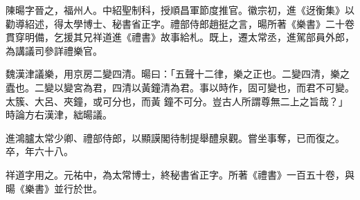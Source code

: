 \begin{pinyinscope}
 陳暘字晉之，福州人。中紹聖制科，授順昌軍節度推官。徽宗初，進《迓衡集》以勸導紹述，得太學博士、秘書省正字。禮部侍郎趙挺之言，暘所著《樂書》二十卷貫穿明備，乞援其兄祥道進《禮書》故事給札。既上，遷太常丞，進駕部員外郎，為講議司參詳禮樂官。



 魏漢津議樂，用京房二變四清。暘曰：「五聲十二律，樂之正也。二變四清，樂之蠹也。二變以變宮為君，四清以黃鐘清為君。事以時作，固可變也，而君不可變。太簇、大呂、夾鐘，或可分也，而黃
 鐘不可分。豈古人所謂尊無二上之旨哉？」時論方右漢津，絀暘議。



 進鴻臚太常少卿、禮部侍郎，以顯謨閣待制提舉醴泉觀。嘗坐事奪，已而復之。卒，年六十八。



 祥道字用之。元祐中，為太常博士，終秘書省正字。所著《禮書》一百五十卷，與暘《樂書》並行於世。



\end{pinyinscope}